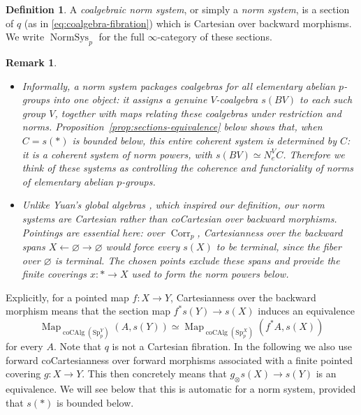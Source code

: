 \documentclass[11pt,a4paper]{article}
\newtheorem{remark}[thm]{Remark}
\theoremstyle{definition}
\newtheorem{defn}[thm]{Definition}
\newcommand{\Sp}{\mathrm{Sp}}
\newcommand{\coAlg}{\operatorname{coCAlg}}
\newcommand{\NormSys}{\operatorname{NormSys}}
\newcommand{\Map}{\operatorname{Map}}
\newcommand{\Corr}{\operatorname{Corr}_p}
\begin{document}
\begin{defn}\label{def:coalgebraic-norm-systems}
A \emph{coalgebraic norm system}, or simply a \emph{norm system},
is a section of $q$ (as in 
\eqref{eq:coalgebra-fibration}) which is Cartesian
over backward morphisms. We write
$\NormSys_p$ for the full $\infty$-category of
these sections. 
\end{defn}


\begin{remark}
\begin{itemize}
\item
Informally, a norm system packages coalgebras for all
elementary abelian $p$-groups  into one object: it assigns a genuine $V$-coalgebra $s(BV)$ to each such
group $V$, together with maps relating these coalgebras under
restriction and norms. 
Proposition~\ref{prop:sections-equivalence} below shows that, when
$C=s(*)$ is bounded below, this entire coherent system is determined
by $C$: it is a coherent system of norm powers, with
$s(BV)\simeq N_e^VC$. Therefore we think of these systems as controlling the coherence and functoriality of norms of elementary abelian $p$-groups. 
\item

Unlike Yuan's global algebras \cite[Definition~3.19]{Yuan},
which inspired our definition, our norm systems are Cartesian
rather than coCartesian over backward morphisms.
Pointings are essential here: over $\Corr$,
Cartesianness over the backward spans
$X\leftarrow\varnothing\to\varnothing$ would force every $s(X)$
to be terminal, since the fiber over $\varnothing$ is terminal.
The chosen points exclude these spans and provide the finite
coverings $x:*\to X$ used to form the norm powers below.
\end{itemize}
\end{remark}

Explicitly, for a pointed map $f:X\to Y$, Cartesianness over the backward morphism means that
the section map $f^*s(Y)\to s(X)$ induces an equivalence
\[
 \Map_{\coAlg(\Sp_p^Y)}(A,s(Y))\simeq\Map_{\coAlg(\Sp_p^X)}(f^*A,s(X))
\]
for every $A$. Note that  $q$ is not a Cartesian fibration. 
In the following we also use forward coCartesianness over forward morphisms associated with a finite pointed covering $g:X\to Y$. This then concretely means that
$g_\otimes s(X)\to s(Y)$ is an equivalence. We will see below that this is automatic for a norm system, provided that $s(*)$ is bounded below.
\end{document}
